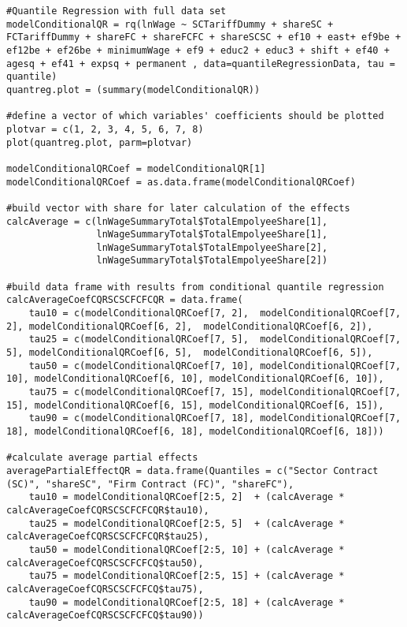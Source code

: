 \begin{lstlisting}
#Quantile Regression with full data set
modelConditionalQR = rq(lnWage ~ SCTariffDummy + shareSC + FCTariffDummy + shareFC + shareFCFC + shareSCSC + ef10 + east+ ef9be + ef12be + ef26be + minimumWage + ef9 + educ2 + educ3 + shift + ef40 + agesq + ef41 + expsq + permanent , data=quantileRegressionData, tau = quantile)
quantreg.plot = (summary(modelConditionalQR))

#define a vector of which variables' coefficients should be plotted
plotvar = c(1, 2, 3, 4, 5, 6, 7, 8)  
plot(quantreg.plot, parm=plotvar)

modelConditionalQRCoef = modelConditionalQR[1]
modelConditionalQRCoef = as.data.frame(modelConditionalQRCoef)

#build vector with share for later calculation of the effects
calcAverage = c(lnWageSummaryTotal$TotalEmpolyeeShare[1],      
                lnWageSummaryTotal$TotalEmpolyeeShare[1],
                lnWageSummaryTotal$TotalEmpolyeeShare[2],
                lnWageSummaryTotal$TotalEmpolyeeShare[2])

#build data frame with results from conditional quantile regression
calcAverageCoefCQRSCSCFCFCQR = data.frame(
	tau10 = c(modelConditionalQRCoef[7, 2],  modelConditionalQRCoef[7, 2], modelConditionalQRCoef[6, 2],  modelConditionalQRCoef[6, 2]), 
	tau25 = c(modelConditionalQRCoef[7, 5],  modelConditionalQRCoef[7, 5], modelConditionalQRCoef[6, 5],  modelConditionalQRCoef[6, 5]), 
	tau50 = c(modelConditionalQRCoef[7, 10], modelConditionalQRCoef[7, 10], modelConditionalQRCoef[6, 10], modelConditionalQRCoef[6, 10]), 
	tau75 = c(modelConditionalQRCoef[7, 15], modelConditionalQRCoef[7, 15], modelConditionalQRCoef[6, 15], modelConditionalQRCoef[6, 15]), 
	tau90 = c(modelConditionalQRCoef[7, 18], modelConditionalQRCoef[7, 18], modelConditionalQRCoef[6, 18], modelConditionalQRCoef[6, 18]))

#calculate average partial effects
averagePartialEffectQR = data.frame(Quantiles = c("Sector Contract (SC)", "shareSC", "Firm Contract (FC)", "shareFC"), 
	tau10 = modelConditionalQRCoef[2:5, 2]  + (calcAverage * calcAverageCoefCQRSCSCFCFCQR$tau10),     
	tau25 = modelConditionalQRCoef[2:5, 5]  + (calcAverage * calcAverageCoefCQRSCSCFCFCQR$tau25), 
	tau50 = modelConditionalQRCoef[2:5, 10] + (calcAverage * calcAverageCoefCQRSCSCFCFCQ$tau50),
	tau75 = modelConditionalQRCoef[2:5, 15] + (calcAverage * calcAverageCoefCQRSCSCFCFCQ$tau75),
	tau90 = modelConditionalQRCoef[2:5, 18] + (calcAverage * calcAverageCoefCQRSCSCFCFCQ$tau90))                                                 


\end{lstlisting}
